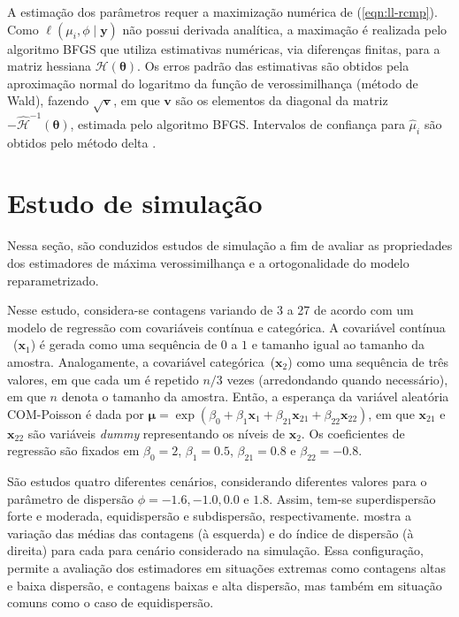 \documentclass[
    oldfontcommands,
    11pt,
    openright,
    twoside,
    a4paper,
    english,
    brazil
]{abntex2}\usepackage[]{graphicx}\usepackage[]{color}
\begin{document}
A estimação dos parâmetros requer a maximização numérica de
(\ref{eqn:ll-rcmp}). Como $\ell(\mu_i, \phi \mid \bm{y})$ não possui
derivada analítica, a maximação é realizada pelo algoritmo BFGS
\citep{Nocedal1995} que utiliza estimativas numéricas, via diferenças
finitas, para a matriz hessiana $\mathcal{H}(\bm{\theta})$. Os erros
padrão das estimativas são obtidos pela aproximação normal do logaritmo
da função de verossimilhança (método de Wald), fazendo $\sqrt{\bm{v}}$,
em que $\bm{v}$ são os elementos da diagonal da matriz
$-\hat{\mathcal{H}}^{-1}(\bm{\theta})$, estimada pelo algoritmo
BFGS. Intervalos de confiança para $\hat{\mu}_i$ são obtidos pelo método
delta \citep[p. 89]{Pawitan2001}.

\section{Estudo de simulação}

Nessa seção, são conduzidos estudos de simulação a fim de avaliar as
propriedades dos estimadores de máxima verossimilhança e a
ortogonalidade do modelo reparametrizado.

Nesse estudo, considera-se contagens variando de 3 a 27 de acordo com um
modelo de regressão com covariáveis contínua e categórica. A covariável
contínua ~($\bm{x}_1$) é gerada como uma sequência de $0$ a $1$ e
tamanho igual ao tamanho da amostra.  Analogamente, a covariável
categórica~($\bm{x}_2$) como uma sequência de três valores, em que cada
um é repetido $n/3$ vezes (arredondando quando necessário), em que $n$
denota o tamanho da amostra. Então, a esperança da variável aleatória
COM-Poisson é dada por
$\bm{\mu} = \exp(\beta_0 + \beta_1 \bm{x}_1 + \beta_{21} \bm{x}_{21} +
\beta_{22} \bm{x}_{22})$,
em que $\bm{x}_{21}$ e $\bm{x}_{22}$ são variáveis \textit{dummy}
representando os níveis de $\bm{x}_2$.  Os coeficientes de regressão são
fixados em $\beta_0 = 2$, $\beta_1 = 0.5$, $\beta_{21} = 0.8$ e
$\beta_{22} = -0.8$.

São estudos quatro diferentes cenários, considerando diferentes valores
para o parâmetro de dispersão $\phi = -1.6, -1.0, 0.0$ e $1.8$. Assim,
tem-se superdispersão forte e moderada, equidispersão e subdispersão,
respectivamente.   mostra a variação das médias das
contagens (à esquerda) e do índice de dispersão (à direita) para cada
para cenário considerado na simulação. Essa configuração, permite a
avaliação dos estimadores em situações extremas como contagens altas e
baixa dispersão, e contagens baixas e alta dispersão, mas também em
situação comuns como o caso de equidispersão.
\end{document}
